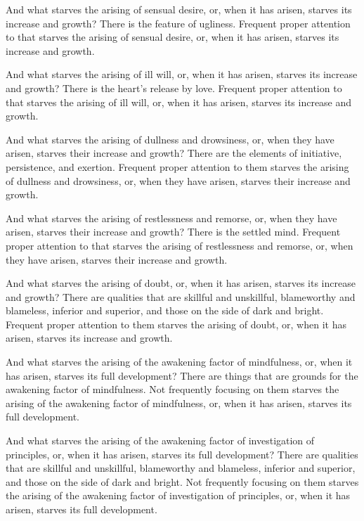 \documentclass[12pt,openany]{book}%
\begin{document}
And what starves the arising of sensual desire, or, when it has arisen, starves its increase and growth? There is the feature of ugliness. Frequent proper attention to that starves the arising of sensual desire, or, when it has arisen, starves its increase and growth. 

And what starves the arising of ill will, or, when it has arisen, starves its increase and growth? There is the heart’s release by love. Frequent proper attention to that starves the arising of ill will, or, when it has arisen, starves its increase and growth. 

And what starves the arising of dullness and drowsiness, or, when they have arisen, starves their increase and growth? There are the elements of initiative, persistence, and exertion. Frequent proper attention to them starves the arising of dullness and drowsiness, or, when they have arisen, starves their increase and growth. 

And what starves the arising of restlessness and remorse, or, when they have arisen, starves their increase and growth? There is the settled mind. Frequent proper attention to that starves the arising of restlessness and remorse, or, when they have arisen, starves their increase and growth. 

And what starves the arising of doubt, or, when it has arisen, starves its increase and growth? There are qualities that are skillful and unskillful, blameworthy and blameless, inferior and superior, and those on the side of dark and bright. Frequent proper attention to them starves the arising of doubt, or, when it has arisen, starves its increase and growth. 

And what starves the arising of the awakening factor of mindfulness, or, when it has arisen, starves its full development? There are things that are grounds for the awakening factor of mindfulness. Not frequently focusing on them starves the arising of the awakening factor of mindfulness, or, when it has arisen, starves its full development. 

And what starves the arising of the awakening factor of investigation of principles, or, when it has arisen, starves its full development? There are qualities that are skillful and unskillful, blameworthy and blameless, inferior and superior, and those on the side of dark and bright. Not frequently focusing on them starves the arising of the awakening factor of investigation of principles, or, when it has arisen, starves its full development. 
\end{document}
